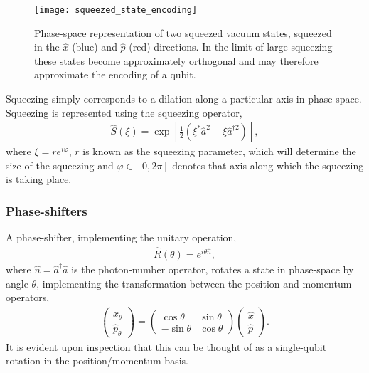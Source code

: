 \begin{figure}[!htbp]
\texttt{[image: squeezed\_state\_encoding]}
\captionspacefig \caption{Phase-space representation of two squeezed vacuum states, squeezed in the $\hat{x}$ (blue) and $\hat{p}$ (red) directions. In the limit of large squeezing these states become approximately orthogonal and may therefore approximate the encoding of a qubit.} \label{fig:squeezed_state_encoding}	
\end{figure}

Squeezing simply corresponds to a dilation along a particular axis in phase-space. Squeezing is represented using the squeezing operator,
\begin{align}\label{eq:sq_op}
\hat{S}(\xi) = \exp\left[ \frac{1}{2}(\xi^*\hat{a}^2 - \xi{\hat{a}^{\dag 2}})\right],
\end{align}
where \mbox{$\xi  = r e^{i \varphi}$}, $r$ is known as the squeezing parameter, which will determine the size of the squeezing and \mbox{$\varphi \in [0, 2\pi]$} denotes that axis along which the squeezing is taking place.


%
%

\subsubsection{Phase-shifters}

A phase-shifter, implementing the unitary operation,
\begin{align}
\hat{R}(\theta) = e^{i\theta \hat{n}},
\end{align}
where \mbox{$\hat{n}=\hat a^\dag \hat a$} is the photon-number operator, rotates a state in phase-space by angle $\theta$, implementing the transformation between the position and momentum operators,
\begin{align}
\begin{pmatrix}
\hat x_{\theta}\\
\hat p_{\theta}
\end{pmatrix}
=
\begin{pmatrix}\cos\theta & \sin\theta \\
-\sin\theta & \cos\theta
\end{pmatrix}
\begin{pmatrix}
\hat x\\
\hat p
\end{pmatrix}.
\end{align}
It is evident upon inspection that this can be thought of as a single-qubit rotation in the position/momentum basis. 


